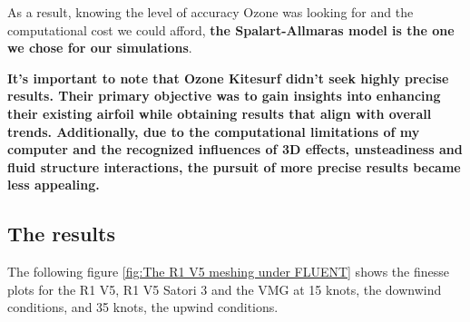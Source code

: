 As a result, knowing the level of accuracy Ozone was looking for and the computational cost we could afford, \textbf{the Spalart-Allmaras model is the one we chose for our simulations}. 

\textbf{It's important to note that Ozone Kitesurf didn't seek highly precise results. Their primary objective was to gain insights into enhancing their existing airfoil while obtaining results that align with overall trends. Additionally, due to the computational limitations of my computer and the recognized influences of 3D effects, unsteadiness and fluid structure interactions, the pursuit of more precise results became less appealing.}


\subsection{The results}
\label{sub:Ch1.6.3}

The following figure \ref{fig:The R1 V5 meshing under FLUENT} shows the finesse plots for the R1 V5, R1 V5 Satori 3 and the VMG at 15 knots, the downwind conditions, and 35 knots, the upwind conditions. 

